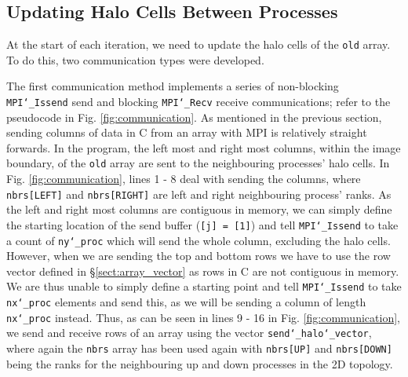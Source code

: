 \documentclass[11pt, a4paper]{article}
\begin{document}
		\subsection{Updating Halo Cells Between Processes}
			At the start of each iteration, we need to update the halo cells of the \texttt{old} array. To do this, two communication types were developed.
			
			The first communication method implements a series of non-blocking \texttt{MPI\char`_Issend} send and blocking \texttt{MPI\char`_Recv} receive communications; refer to the pseudocode in Fig. \ref{fig:communication}. As mentioned in the previous section, sending columns of data in C from an array with MPI is relatively straight forwards. In the program, the left most and right most columns, within the image boundary, of the \texttt{old} array are sent to the neighbouring processes' halo cells. In Fig. \ref{fig:communication}, lines 1 - 8 deal with sending the columns, where \texttt{nbrs[LEFT]} and \texttt{nbrs[RIGHT]} are left and right neighbouring process' ranks. As the left and right most columns are contiguous in memory, we can simply define the starting location of the send buffer (\texttt{[j] = [1]}) and tell \texttt{MPI\char`_Issend} to take a count of \texttt{ny\char`_proc} which will send the whole column, excluding the halo cells. However, when we are sending the top and bottom rows we have to use the row vector defined in \S\ref{sect:array_vector} as rows in C are not contiguous in memory. We are thus unable to simply define a starting point and tell \texttt{MPI\char`_Issend} to take \texttt{nx\char`_proc} elements and send this, as we will be sending a column of length \texttt{nx\char`_proc} instead. Thus, as can be seen in lines 9 - 16 in Fig. \ref{fig:communication}, we send and receive rows of an array using the vector \texttt{send\char`_halo\char`_vector}, where again the \texttt{nbrs} array has been used again with \texttt{nbrs[UP]} and \texttt{nbrs[DOWN]} being the ranks for the neighbouring up and down processes in the 2D topology.
						
\end{document}
